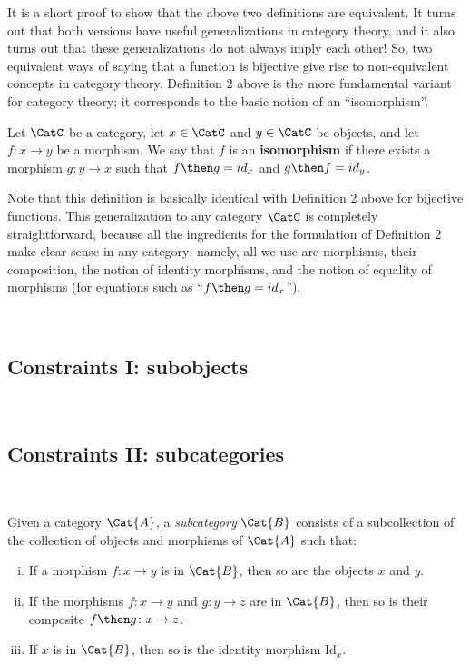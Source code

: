 It is a short proof to show that the above two definitions are equivalent. It turns out that both versions have useful generalizations in category theory, and it also turns out that these generalizations do not always imply each other! So, two equivalent ways of saying that a function is bijective give rise to non-equivalent concepts in category theory. Definition 2 above is the more fundamental variant for category theory; it corresponds to the basic notion of an ``isomorphism''. 

\begin{shaded}
\begin{definition}[Isomorphism]
Let $\CatC$ be a category, let $x \in \CatC$ and $y \in \CatC$ be objects, and let $f: x \rightarrow y$ be a morphism. We say that $f$ is an \textbf{isomorphism} if there exists a morphism $g: y \rightarrow x$ such that $f \then g = id_x$ and $g \then f = id_y$. 
\end{definition}
\end{shaded}

Note that this definition is basically identical with Definition 2 above for bijective functions. This generalization to any category $\CatC$ is completely straightforward, because all the ingredients for the formulation of Definition 2 make clear sense in any category; namely, all we use are morphisms, their composition, the notion of identity morphisms, and the notion of equality of morphisms (for equations such as ``$f \then g = id_x$'').
 
\


\subsection{Constraints I: subobjects}

\


\subsection{Constraints II: subcategories}




\
\begin{shaded}
\begin{definition}[Subcategory]
\label{def:subcategory}
	Given a category $\Cat{A}$, a \emph{subcategory} $\Cat{B}$ consists of a subcollection of the collection of objects and morphisms of $\Cat{A}$ such that:
	\begin{enumerate}[(i)]
	\item If a morphism $f \colon x\to y$ is in $\Cat{B}$, then so are the objects $x$ and $y$.
	\item If the morphisms $f\colon x\to y$ and $g\colon y\to z$ are in $\Cat{B}$, then so is their composite $f\then g\colon x\to z$.
	\item If $x$ is in $\Cat{B}$, then so is the identity morphism $\text{Id}_x$.
	\end{enumerate}
\end{definition}
\end{shaded}
